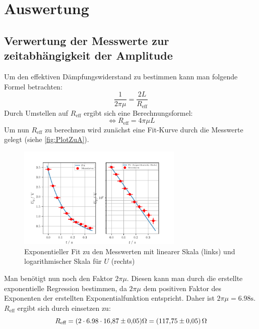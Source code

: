 \section{Auswertung}
\label{sec:Auswertung}
\subsection{Verwertung der Messwerte zur zeitabhängigkeit der Amplitude}
\label{subsec:AuswertungA}

Um den effektiven Dämpfungswiderstand zu bestimmen kann man folgende Formel betrachten: 
\begin{equation}
  \label{eqn:Abklingdauer}
  \frac{1}{2\pi\mu} = \frac{2L}{R_{\text{eff}}}
\end{equation}
Durch Umstellen auf $R_{\text{eff}}$ ergibt sich eine Berechnungsformel:
\begin{equation}
  \label{Abklingdauer1}
  \Longleftrightarrow R_{\text{eff}} = 4\pi\mu L
\end{equation}
Um nun $R_{\text{eff}}$ zu berechnen wird zunächst eine Fit-Kurve durch die Messwerte gelegt (siehe \autoref{fig:PlotZuA}).

\-\begin{figure}
  \centering
  \includegraphics[width=0.7\textwidth]{PlotZuA.pdf}
  \caption{Exponentieller Fit zu den Messwerten mit linearer Skala (links) und logarithmischer Skala für $U$ (rechts)}
  \label{fig:PlotZuA}
\end{figure}

Man benötigt nun noch den Faktor $2\pi\mu$. Diesen kann man durch die erstellte exponentielle Regression 
bestimmen, da $2\pi\mu$ dem positiven Faktor des Exponenten der erstellten Exponentialfunktion entspricht. 
Daher ist $2\pi\mu = 6.98\unit{\second}$.
$R_{\text{eff}}$ ergibt sich durch einsetzen zu:
\begin{equation*}
  R_{\text{eff}} = (2\cdot 6.98\cdot \num{16.87\pm 0.05}) \unit{\ohm} = (\num{117.75 \pm 0.05})\,\unit{\ohm}
\end{equation*}

